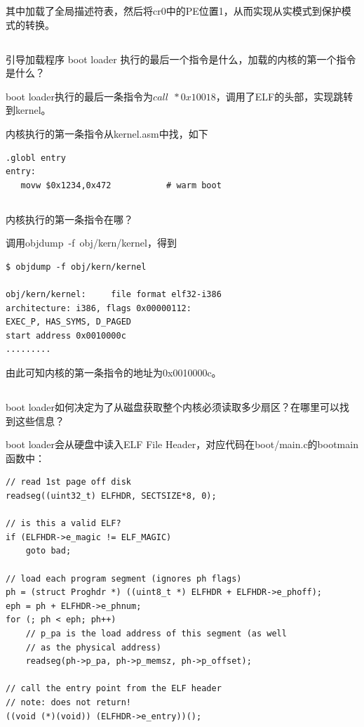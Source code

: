 \documentclass[12pt,a4paper,UTF8]{article}
\begin{document}
	其中加载了全局描述符表，然后将cr0中的PE位置1，从而实现从实模式到保护模式的转换。

    \subsection{}
	引导加载程序 boot loader 执行的最后一个指令是什么，加载的内核的第一个指令是什么？

	boot loader执行的最后一条指令为$call\ \ *0x10018$，调用了ELF的头部，实现跳转到kernel。

	内核执行的第一条指令从kernel.asm中找，如下
	\begin{lstlisting}[style=MASM]
.globl entry
entry:
   movw	$0x1234,0x472			# warm boot
	\end{lstlisting}
    \subsection{}
	内核执行的第一条指令在哪？

	调用objdump\ -f\ obj/kern/kernel，得到
	\begin{lstlisting}[style=BASH]
$ objdump -f obj/kern/kernel

obj/kern/kernel:     file format elf32-i386
architecture: i386, flags 0x00000112:
EXEC_P, HAS_SYMS, D_PAGED
start address 0x0010000c
.........
	\end{lstlisting}

	由此可知内核的第一条指令的地址为0x0010000c。

	\subsection{}
	boot loader如何决定为了从磁盘获取整个内核必须读取多少扇区？在哪里可以找到这些信息？

	boot loader会从硬盘中读入ELF File Header，对应代码在boot/main.c的bootmain函数中：
	\begin{lstlisting}[style=CPP]
// read 1st page off disk
readseg((uint32_t) ELFHDR, SECTSIZE*8, 0);

// is this a valid ELF?
if (ELFHDR->e_magic != ELF_MAGIC)
	goto bad;

// load each program segment (ignores ph flags)
ph = (struct Proghdr *) ((uint8_t *) ELFHDR + ELFHDR->e_phoff);
eph = ph + ELFHDR->e_phnum;
for (; ph < eph; ph++)
	// p_pa is the load address of this segment (as well
	// as the physical address)
	readseg(ph->p_pa, ph->p_memsz, ph->p_offset);

// call the entry point from the ELF header
// note: does not return!
((void (*)(void)) (ELFHDR->e_entry))();
	\end{lstlisting}
\end{document}
